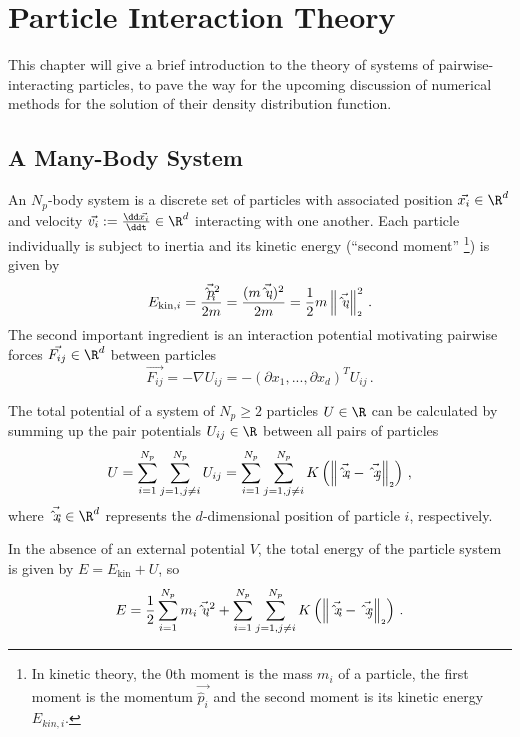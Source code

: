 \chapter{Particle Interaction Theory}
\label{chap:particle-interaction-theory}

This chapter will give a brief introduction to the theory of systems of pairwise-interacting particles, to pave the way for the upcoming discussion of numerical methods for the solution of their density distribution function.

\section{A Many-Body System}
An $N_p$-body system is a discrete set of particles with associated position $\vec{x_i} \in \R^d$ and velocity $\vec{v_i} := \frac{\dd\vec{x_i}}{\ddt} \in \R^d$ interacting with one another.
Each particle individually is subject to inertia and its kinetic energy (``second moment'' \footnote{
  In kinetic theory, the $0$th moment is the mass $m_i$ of a particle, the first moment is the momentum $\vec{\hat{p}_i}$ and the second moment is its kinetic energy $E_{kin,i}$.
}) is given by
$$E_{\text{kin},i} = \frac{\vec{\hat{p}_i}^2}{2m} = \frac{(m \vec{\hat{v}_i})^2}{2m} = \frac{1}{2} m \left\lVert\vec{\hat{v}_i}\right\rVert_{\scriptscriptstyle 2}^2\,.$$
The second important ingredient is an interaction potential motivating pairwise forces $\vec{F_{ij}} \in \R^d$ between particles
$$\vec{F_{ij}} = -\nabla U_{ij} = -\left(\partial x_1, ..., \partial x_d\right)^T U_{ij}\,.$$

The total potential of a system of $N_p \ge 2$ particles $U \in \R$ can be calculated by summing up the pair potentials $U_{ij} \in \R$ between all pairs of particles
$$U = \sum_{i=1}^{N_p}\sum_{j=1, j \neq i}^{N_p} U_{ij} = \sum_{i=1}^{N_p}\sum_{j=1, j \neq i}^{N_p} K\left(\left\lVert\vec{\hat{x}_i} - \vec{\hat{x}_j}\right\rVert_{\scriptscriptstyle 2}\right)\,,$$
where $\vec{\hat{x}_i} \in \R^d$ represents the $d$-dimensional position of particle $i$, respectively.

In the absence of an external potential $V$, the total energy of the particle system is given by $E = E_{\text{kin}} + U$, so
\begin{equation}
  E = \frac{1}{2} \sum_{i=1}^{N_p} m_i \vec{\hat{v}_i}^2 + \sum_{i=1}^{N_p}\sum_{j=1, j \neq i}^{N_p} K\left(\left\lVert\vec{\hat{x}_i} - \vec{\hat{x}_j}\right\rVert_{\scriptscriptstyle 2}\right)\,.
  \label{eq:total-energy}
\end{equation}

